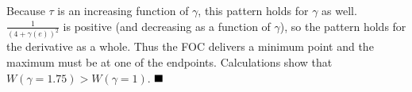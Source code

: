 \documentclass[12pt]{article}
\newcommand{\ga}{\gamma}
\begin{document}
				Because $\tau$ is an increasing function of $\ga$, this pattern holds for $\ga$ as well. $\frac{1}{\left(4+\ga(e)\right)^2}$ is positive (and decreasing as a function of $\ga$), so the pattern holds for the derivative as a whole. Thus the FOC delivers a minimum point and the maximum must be at one of the endpoints. Calculations show that $W(\ga=1.75) > W(\ga=1)$. $\hfill\blacksquare$

\end{document}

